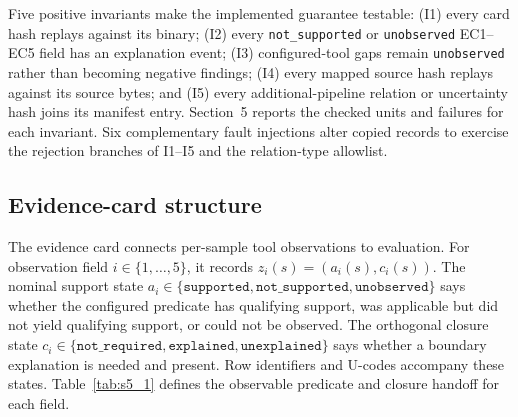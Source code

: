 \documentclass[a4paper,fleqn]{cas-dc}
\begin{document}
Five positive invariants make the implemented guarantee testable: (I1) every card hash replays against its binary; (I2) every \texttt{not\_supported} or \texttt{unobserved} EC1--EC5 field has an explanation event; (I3) configured-tool gaps remain \texttt{unobserved} rather than becoming negative findings; (I4) every mapped source hash replays against its source bytes; and (I5) every additional-pipeline relation or uncertainty hash joins its manifest entry. Section~5 reports the checked units and failures for each invariant. Six complementary fault injections alter copied records to exercise the rejection branches of I1--I5 and the relation-type allowlist.

\subsection{Evidence-card structure}

The evidence card connects per-sample tool observations to evaluation. For observation field $i\in\{1,\ldots,5\}$, it records $z_i(s)=(a_i(s),c_i(s))$. The nominal support state $a_i\in\{\texttt{supported},\texttt{not\_supported},\texttt{unobserved}\}$ says whether the configured predicate has qualifying support, was applicable but did not yield qualifying support, or could not be observed. The orthogonal closure state $c_i\in\{\texttt{not\_required},\texttt{explained},\texttt{unexplained}\}$ says whether a boundary explanation is needed and present. Row identifiers and U-codes accompany these states. Table~\ref{tab:s5_1} defines the observable predicate and closure handoff for each field.
\end{document}
